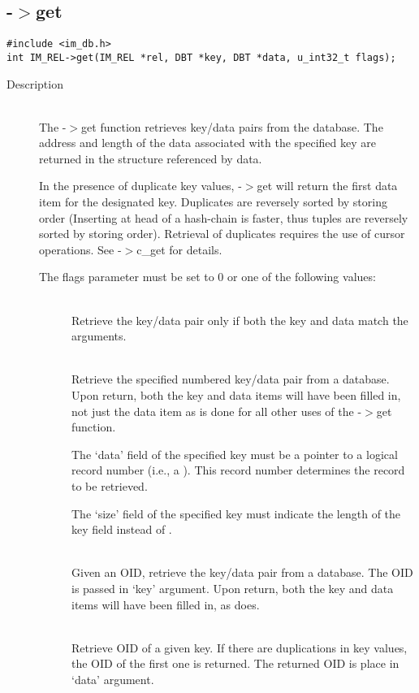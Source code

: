 \subsection{{\IMREL}-$>$get}
\begin{verbatim}
#include <im_db.h>
int IM_REL->get(IM_REL *rel, DBT *key, DBT *data, u_int32_t flags);
\end{verbatim}
\begin{description}
\item[Description]\ \\
  The {\IMREL}-$>$get function retrieves key/data pairs from the database. The
  address and length of the data associated with the specified key are
  returned in the structure referenced by data.

  In the presence of duplicate key values, {\IMREL}-$>$get will return the
  first data item for the designated key. Duplicates are reversely
  sorted by storing order (Inserting at head of a hash-chain is
  faster, thus tuples are reversely sorted by storing order).
  Retrieval of duplicates requires the use of cursor operations. See
  {\IMRELcursor}-$>$c\_get for details.

  The flags parameter must be set to 0 or one of the following values: 
  \begin{description}
  \item[{\DBGETBOTH}]\ \\
    Retrieve the key/data pair only if both the key and data match the
    arguments.
  \item[{\DBSETRECNO}]\ \\
    Retrieve the specified numbered key/data pair from a
    database. Upon return, both the key and data items will have been
    filled in, not just the data item as is done for all other uses of
    the {\IMREL}-$>$get function.

    The `data' field of the specified key must be a pointer to a
    logical record number (i.e., a {\dbrecnot}). This record number
    determines the record to be retrieved.

    The `size' field of the specified key must indicate the length of
    the key field instead of {\dbrecnot}.
  \item[{\DBGETOID}]\ \\
    Given an OID, retrieve the key/data pair from a database.  The OID
    is passed in `key' argument.  Upon return, both the key and data
    items will have been filled in, as {\DBSETRECNO} does.
  \item[{\DBGETOIDOFKEY}]\ \\
    Retrieve OID of a given key.  If there are duplications in key
    values, the OID of the first one is returned.  The returned OID is
    place in `data' argument.
  \end{description}
  

\end{description}
